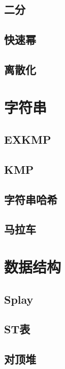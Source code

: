 \documentclass{article}
\begin{document}
\begin{multicols*}{2}
\subsection{二分}

\subsection{快速幂}

\subsection{离散化}

\section{字符串}
\subsection{EXKMP}

\subsection{KMP}

\subsection{字符串哈希}

\subsection{马拉车}

\section{数据结构}
\subsection{Splay}

\subsection{ST表}

\subsection{对顶堆}


\end{multicols*}
\end{document}
